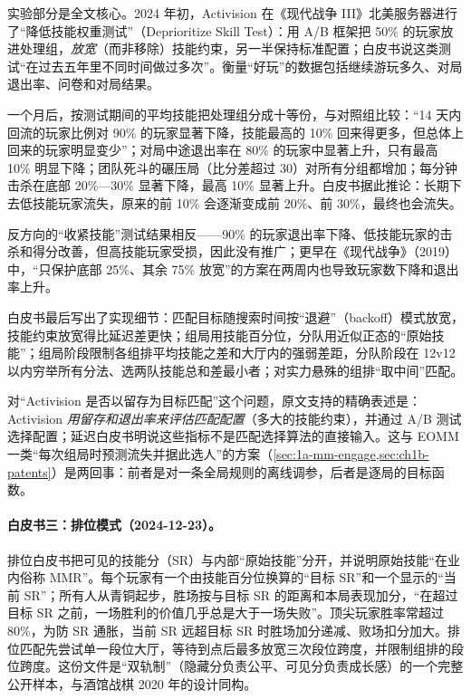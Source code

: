 实验部分是全文核心。2024 年初，Activision 在《现代战争 III》北美服务器进行了“降低技能权重测试”（Deprioritize Skill Test）：用 A/B 框架把 50\% 的玩家放进处理组，\emph{放宽}（而非移除）技能约束，另一半保持标准配置；白皮书说这类测试“在过去五年里不同时间做过多次”\tagOff。衡量“好玩”的数据包括继续游玩多久、对局退出率、问卷和对局结果\tagOff。

一个月后，按测试期间的平均技能把处理组分成十等份，与对照组比较：“14 天内回流的玩家比例对 90\% 的玩家显著下降，技能最高的 10\% 回来得更多，但总体上回来的玩家明显变少”；对局中途退出率在 80\% 的玩家中显著上升，只有最高 10\% 明显下降；团队死斗的碾压局（比分差超过 30）对所有分组都增加；每分钟击杀在底部 20\%—30\% 显著下降，最高 10\% 显著上升\tagOff。白皮书据此推论：长期下去低技能玩家流失，原来的前 10\% 会逐渐变成前 20\%、前 30\%，最终也会流失\tagOff。

反方向的“收紧技能”测试结果相反——90\% 的玩家退出率下降、低技能玩家的击杀和得分改善，但高技能玩家受损，因此没有推广；更早在《现代战争》（2019）中，“只保护底部 25\%、其余 75\% 放宽”的方案在两周内也导致玩家数下降和退出率上升\tagOff。

白皮书最后写出了实现细节：匹配目标随搜索时间按“退避”（backoff）模式放宽，技能约束放宽得比延迟差更快；组局用技能百分位，分队用近似正态的“原始技能”；组局阶段限制各组排平均技能之差和大厅内的强弱差距，分队阶段在 12v12 以内穷举所有分法、选两队技能总和差最小者；对实力悬殊的组排“取中间”匹配\tagOff。

对“Activision 是否以留存为目标匹配”这个问题，原文支持的精确表述是：Activision \emph{用留存和退出率来评估匹配配置}（多大的技能约束），并通过 A/B 测试选择配置；延迟白皮书明说这些指标不是匹配选择算法的直接输入\tagOff。这与 EOMM 一类“每次组局时预测流失并据此选人”的方案（\cref{sec:1a-mm-engage,sec:ch1b-patents}）是两回事：前者是对一条全局规则的离线调参，后者是逐局的目标函数。

\paragraph{白皮书三：排位模式（2024-12-23）。}
排位白皮书把可见的技能分（SR）与内部“原始技能”分开，并说明原始技能“在业内俗称 MMR”\cite{activision2024ranked}\tagOff。每个玩家有一个由技能百分位换算的“目标 SR”和一个显示的“当前 SR”；所有人从青铜起步，胜场按与目标 SR 的距离和本局表现加分，“在超过目标 SR 之前，一场胜利的价值几乎总是大于一场失败”\tagOff。顶尖玩家胜率常超过 80\%，为防 SR 通胀，当前 SR 远超目标 SR 时胜场加分递减、败场扣分加大\tagOff。排位匹配先尝试单一段位大厅，等待到点后最多放宽三次段位跨度，并限制组排的段位跨度\tagOff。这份文件是“双轨制”（隐藏分负责公平、可见分负责成长感）的一个完整公开样本，与酒馆战棋 2020 年的设计同构。

